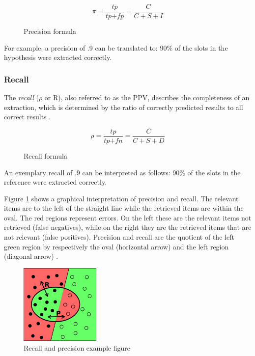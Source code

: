 \begin{figure}[H]
\begin{displaymath}
	\pi = \frac{\textit{tp}}{\textit{tp} + \textit{fp}} = \frac{C}{C+S+I}
\end{displaymath}
\caption{Precision formula}
\end{figure}

For example, a precision of .9 can be translated to: 90\% of the slots in the hypothesis were extracted correctly.

\subsubsection{Recall}
The \textit{recall} (\ensuremath{\rho} or R), also referred to as the \gls{PPV}, describes the completeness of an extraction, which is determined by the ratio of correctly predicted results to all correct results \cite{Carstensen:2010}.

\begin{figure}[H]
\begin{displaymath}
	\rho = \frac{\textit{tp}}{\textit{tp} + \textit{fn}} = \frac{C}{C+S+D}
\end{displaymath}
\caption{Recall formula}
\end{figure}

An exemplary recall of .9 can be interpreted as follows: 90\% of the slots in the reference were extracted correctly.

Figure \ref{fig:recall-precision} shows a graphical interpretation of precision and recall. The relevant items are to the left of the straight line while the retrieved items are within the oval. The red regions represent errors. On the left these are the relevant items not retrieved (false negatives), while on the right they are the retrieved items that are not relevant (false positives). Precision and recall are the quotient of the left green region by respectively the oval (horizontal arrow) and the left region (diagonal arrow) \cite{Wikipedia:Precision_and_recall}.

\begin{figure}[H]
\centering
\includegraphics[width=0.35\textwidth]{recall-precision.png}
\caption{Recall and precision example figure \cite{Wikipedia:Precision_and_recall}}
\label{fig:recall-precision}
\end{figure}

